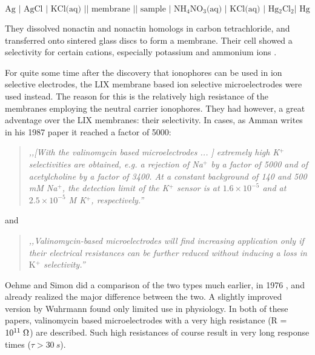\begin{equation}
\text{Ag | AgCl | KCl(aq) || membrane || sample | NH$_4$NO$_3$(aq) | KCl(aq) | Hg$_2$Cl$_2$| Hg}
\end{equation}

They dissolved nonactin and nonactin homologs in carbon tetrachloride, and transferred onto sintered glass discs to form a membrane.
Their cell showed a selectivity for certain cations, especially potassium and ammonium ions \cite{stefanac1966highly, vstefanac1967ion}. 

For quite some time after the discovery that ionophores can be used in ion selective electrodes, the LIX membrane based ion selective microelectrodes were used instead.
The reason for this is the relatively high resistance of the membranes employing the neutral carrier ionophores.
They had however, a great adventage over the LIX membranes: their selectivity.
In cases, as Amman writes in his 1987 paper \cite{ammann1987valinomycin} it reached a factor of 5000:

\begin{quote}
\vspace{0.5cm}
\emph{,,[With the valinomycin based microelectrodes ... ] extremely high K$^+$ selectivities are obtained, e.g. a rejection of Na$^+$ by a factor of 5000 and of acetylcholine by a factor of 3400.
At a constant background of 140 and 500 mM Na$^+$, the detection limit of the K$^+$ sensor is at $1.6\times  10^{-5}$ and at $2.5\times 10^{-5}$ M K$^+$, respectively.''}
\vspace{0.5cm}
\end{quote}

and 

\begin{quote}
\vspace{0.5cm}
\emph{,,Valinomycin-based microelectrodes will find increasing application only if their electrical resistances can be further reduced without inducing a loss in} K\emph{$^+$ selectivity.''}
\vspace{0.5cm}
\end{quote}

Oehme and Simon did a comparison of the two types much earlier, in 1976 \cite{oehme1976microelectrode}, and already realized the major difference between the two.
A slightly improved version by Wuhrmann \cite{wuhrmann1979change} found only limited use in physiology.
In both of these papers, valinomycin based microelectrodes with a very high resistance (R = $10^{11}\; \ohm$) are described.
Such high resistances of course result in very long response times ($\tau > 30~s$). 


